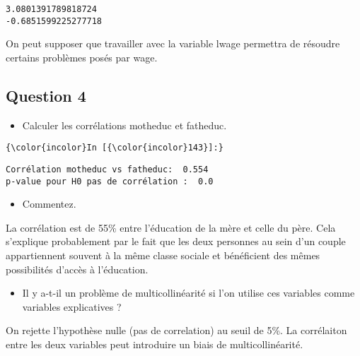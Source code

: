 \documentclass[11pt]{article}
\providecommand{\tightlist}{%
      \setlength{\itemsep}{0pt}\setlength{\parskip}{0pt}}
\begin{document}
    \begin{Verbatim}[commandchars=\\\{\}]
3.0801391789818724
-0.6851599225277718

    \end{Verbatim}

    On peut supposer que travailler avec la variable lwage permettra de
résoudre certains problèmes posés par wage.

    \subsection{Question 4}\label{question-4}

\begin{itemize}
\tightlist
\item
  Calculer les corrélations motheduc et fatheduc.
\end{itemize}

    \begin{Verbatim}[commandchars=\\\{\}]
{\color{incolor}In [{\color{incolor}143}]:} 
\end{Verbatim}


    \begin{Verbatim}[commandchars=\\\{\}]
Corrélation motheduc vs fatheduc:  0.554
p-value pour H0 pas de corrélation :  0.0

    \end{Verbatim}

    \begin{itemize}
\tightlist
\item
  Commentez.
\end{itemize}

La corrélation est de 55\% entre l'éducation de la mère et celle du
père. Cela s'explique probablement par le fait que les deux personnes au
sein d'un couple appartiennent souvent à la même classe sociale et
bénéficient des mêmes possibilités d'accès à l'éducation.

\begin{itemize}
\tightlist
\item
  Il y a-t-il un problème de multicollinéarité si l'on utilise ces
  variables comme variables explicatives ?
\end{itemize}

On rejette l'hypothèse nulle (pas de correlation) au seuil de 5\%. La
corrélaiton entre les deux variables peut introduire un biais de
multicollinéarité.
\end{document}
